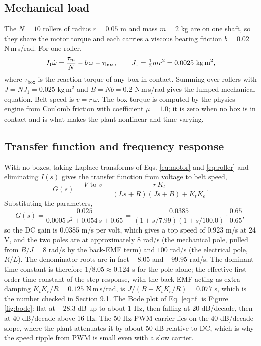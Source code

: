 \documentclass[12pt,a4paper]{article}
\begin{document}
\subsection{Mechanical load}

The $N = 10$ rollers of radius $r = 0.05$ m and mass $m = 2$ kg are on one shaft, so they share the motor torque and each carries a viscous bearing friction $b = 0.02$ N\,m\,s/rad. For one roller,
\begin{equation}
J_1 \dot{\omega} = \frac{\tau_m}{N} - b\,\omega - \tau_{\text{box}}, \qquad J_1 = \tfrac{1}{2} m r^2 = 0.0025 \text{ kg\,m}^2,
\label{eq:roller}
\end{equation}
where $\tau_{\text{box}}$ is the reaction torque of any box in contact. Summing over rollers with $J = N J_1 = 0.025$ kg\,m$^2$ and $B = N b = 0.2$ N\,m\,s/rad gives the lumped mechanical equation. Belt speed is $v = r\,\omega$. The box torque is computed by the physics engine from Coulomb friction with coefficient $\mu = 1.0$; it is zero when no box is in contact and is what makes the plant nonlinear and time varying.

\subsection{Transfer function and frequency response}

With no boxes, taking Laplace transforms of Eqs. \ref{eq:motor} and \ref{eq:roller} and eliminating $I(s)$ gives the transfer function from voltage to belt speed,
\begin{equation}
G(s) = \frac{V\text{-to-}v}{} = \frac{r\,K_t}{(L s + R)(J s + B) + K_t K_e}.
\label{eq:tf}
\end{equation}
Substituting the parameters,
\begin{equation}
G(s) = \frac{0.025}{0.0005\,s^2 + 0.054\,s + 0.65} = \frac{0.0385}{(1 + s/7.99)(1 + s/100.0)}\cdot\frac{0.65}{0.65},
\end{equation}
so the DC gain is $0.0385$ m/s per volt, which gives a top speed of $0.923$ m/s at 24 V, and the two poles are at approximately $8$ rad/s (the mechanical pole, pulled from $B/J = 8$ rad/s by the back-EMF term) and $100$ rad/s (the electrical pole, $R/L$). The denominator roots are in fact $-8.05$ and $-99.95$ rad/s. The dominant time constant is therefore $1/8.05 \approx 0.124$ s for the pole alone; the effective first-order time constant of the step response, with the back-EMF acting as extra damping $K_t K_e / R = 0.125$ N\,m\,s/rad, is $J/(B + K_t K_e/R) = 0.077$ s, which is the number checked in Section 9.1. The Bode plot of Eq. \ref{eq:tf} is Figure \ref{fig:bode}: flat at $-28.3$ dB up to about 1 Hz, then falling at 20 dB/decade, then at 40 dB/decade above 16 Hz. The 50 Hz PWM carrier lies on the 40 dB/decade slope, where the plant attenuates it by about 50 dB relative to DC, which is why the speed ripple from PWM is small even with a slow carrier.
\end{document}
